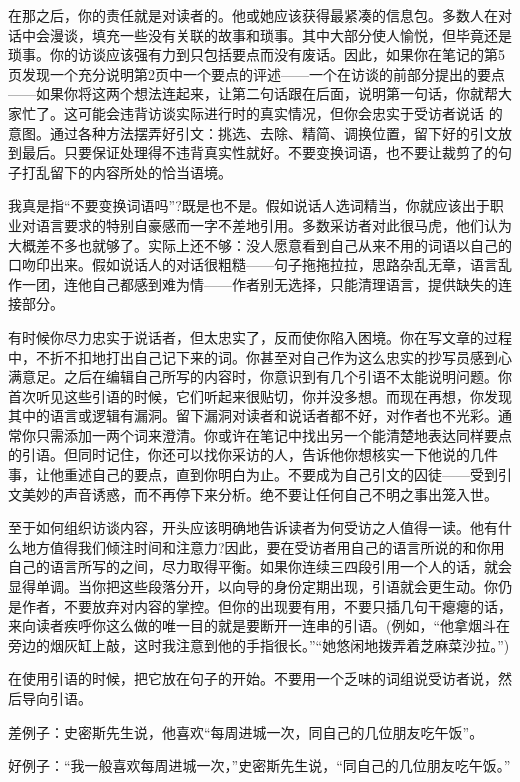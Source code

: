 在那之后，你的责任就是对读者的。他或她应该获得最紧凑的信息包。多数人在对话中会漫谈，填充一些没有关联的故事和琐事。其中大部分使人愉悦，但毕竟还是琐事。你的访谈应该强有力到只包括要点而没有废话。因此，如果你在笔记的第5页发现一个充分说明第2页中一个要点的评述——一个在访谈的前部分提出的要点——如果你将这两个想法连起来，让第二句话跟在后面，说明第一句话，你就帮大家忙了。这可能会违背访谈实际进行时的真实情况，但你会忠实于受访者说话 的意图。通过各种方法摆弄好引文：挑选、去除、精简、调换位置，留下好的引文放到最后。只要保证处理得不违背真实性就好。不要变换词语，也不要让裁剪了的句子打乱留下的内容所处的恰当语境。

我真是指“不要变换词语吗”?既是也不是。假如说话人选词精当，你就应该出于职业对语言要求的特别自豪感而一字不差地引用。多数采访者对此很马虎，他们认为大概差不多也就够了。实际上还不够：没人愿意看到自己从来不用的词语以自己的口吻印出来。假如说话人的对话很粗糙——句子拖拖拉拉，思路杂乱无章，语言乱作一团，连他自己都感到难为情——作者别无选择，只能清理语言，提供缺失的连接部分。

有时候你尽力忠实于说话者，但太忠实了，反而使你陷入困境。你在写文章的过程中，不折不扣地打出自己记下来的词。你甚至对自己作为这么忠实的抄写员感到心满意足。之后在编辑自己所写的内容时，你意识到有几个引语不太能说明问题。你首次听见这些引语的时候，它们听起来很贴切，你并没多想。而现在再想，你发现其中的语言或逻辑有漏洞。留下漏洞对读者和说话者都不好，对作者也不光彩。通常你只需添加一两个词来澄清。你或许在笔记中找出另一个能清楚地表达同样要点的引语。但同时记住，你还可以找你采访的人，告诉他你想核实一下他说的几件事，让他重述自己的要点，直到你明白为止。不要成为自己引文的囚徒——受到引文美妙的声音诱惑，而不再停下来分析。绝不要让任何自己不明之事出笼入世。

至于如何组织访谈内容，开头应该明确地告诉读者为何受访之人值得一读。他有什么地方值得我们倾注时间和注意力?因此，要在受访者用自己的语言所说的和你用自己的语言所写的之间，尽力取得平衡。如果你连续三四段引用一个人的话，就会显得单调。当你把这些段落分开，以向导的身份定期出现，引语就会更生动。你仍是作者，不要放弃对内容的掌控。但你的出现要有用，不要只插几句干瘪瘪的话，来向读者疾呼你这么做的唯一目的就是要断开一连串的引语。(例如，“他拿烟斗在旁边的烟灰缸上敲，这时我注意到他的手指很长。”“她悠闲地拨弄着芝麻菜沙拉。”)

在使用引语的时候，把它放在句子的开始。不要用一个乏味的词组说受访者说，然后导向引语。

差例子：史密斯先生说，他喜欢“每周进城一次，同自己的几位朋友吃午饭”。

好例子：“我一般喜欢每周进城一次，”史密斯先生说，“同自己的几位朋友吃午饭。”


